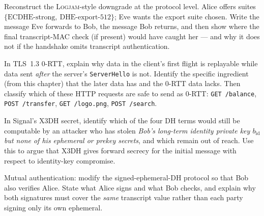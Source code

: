 \begin{exercise}
Reconstruct the \textsc{Logjam}-style downgrade at the protocol level. Alice
offers suites $\{\text{ECDHE-strong},\ \text{DHE-export-512}\}$; Eve wants the
export suite chosen. Write the message Eve forwards to Bob, the message Bob
returns, and then show where the final transcript-MAC check (if present)
would have caught her --- and why it does not if the handshake omits transcript
authentication.
\end{exercise}

\begin{exercise}
In TLS~1.3 0-RTT, explain why data in the client's first flight is replayable
while data sent \emph{after} the server's \texttt{ServerHello} is not. Identify the
specific ingredient (from this chapter) that the later data has and the 0-RTT
data lacks. Then classify which of these HTTP requests are safe to send as 0-RTT:
\texttt{GET /balance}, \texttt{POST /transfer}, \texttt{GET /logo.png},
\texttt{POST /search}.
\end{exercise}

\begin{exercise}
In Signal's X3DH secret, identify which of the four DH terms would still be
computable by an attacker who has stolen \emph{Bob's long-term identity private
key $b_{\mathrm{id}}$ but none of his ephemeral or prekey secrets}, and which remain out of reach.
Use this to argue that X3DH gives forward secrecy for the initial message with
respect to identity-key compromise.
\end{exercise}

\begin{exercise}
Mutual authentication: modify the signed-ephemeral-DH protocol so that Bob also
verifies Alice. State what Alice signs and what Bob checks, and explain
why both signatures must cover the \emph{same} transcript value rather than each
party signing only its own ephemeral.
\end{exercise}
